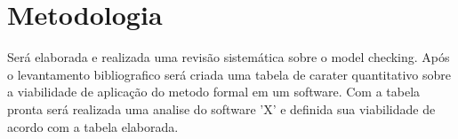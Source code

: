 \section{Metodologia}

Será elaborada e realizada uma revisão sistemática sobre o model checking.
Após o levantamento bibliografico será criada uma tabela de carater quantitativo sobre a viabilidade de aplicação do metodo formal em um software.
Com a tabela pronta será realizada uma analise do software 'X' e definida sua viabilidade de acordo com a tabela elaborada.

\newpage